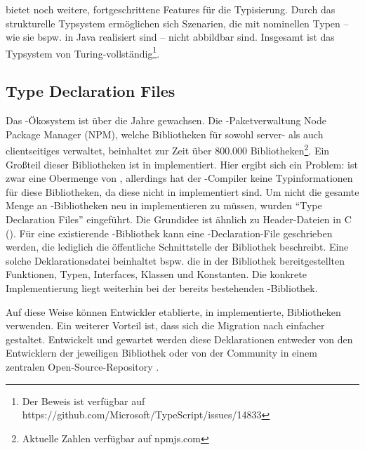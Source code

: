 \documentclass[a4paper]{scrartcl}
\begin{document}
\ts{} bietet noch weitere, fortgeschrittene Features für die Typisierung.
Durch das strukturelle Typsystem ermöglichen sich Szenarien, die mit nominellen Typen -- wie sie bspw. in Java realisiert sind -- nicht abbildbar sind.
Insgesamt ist das Typsystem von \ts{} Turing-vollständig\footnote{Der Beweis ist verfügbar auf https://github.com/Microsoft/TypeScript/issues/14833}.

\subsection{Type Declaration Files}\label{dts}
Das \js-Ökosystem ist über die Jahre gewachsen.
Die \js-Paketverwaltung Node Package Manager (NPM), welche Bibliotheken für sowohl server- als auch clientseitiges \js{} verwaltet, beinhaltet zur Zeit über 800.000 Bibliotheken\footnote{Aktuelle Zahlen verfügbar auf npmjs.com}.
Ein Großteil dieser Bibliotheken ist in \js{} implementiert.
Hier ergibt sich ein Problem:
\ts{} ist zwar eine Obermenge von \js{}, allerdings hat der \ts-Compiler keine Typinformationen für diese Bibliotheken, da diese nicht in \ts{} implementiert sind.
Um nicht die gesamte Menge an \js-Bibliotheken neu in \ts{} implementieren zu müssen, wurden \enquote{Type Declaration Files} eingeführt.
Die Grundidee ist ähnlich zu Header-Dateien in C ().
Für eine existierende \js-Bibliothek kann eine \ts-Declaration-File geschrieben werden, die lediglich die öffentliche Schnittstelle der Bibliothek beschreibt.
Eine solche Deklarationsdatei beinhaltet bspw. die in der Bibliothek bereitgestellten Funktionen, Typen, Interfaces, Klassen und Konstanten.
Die konkrete Implementierung liegt weiterhin bei der bereits bestehenden \js-Bibliothek.

Auf diese Weise können Entwickler etablierte, in \js{} implementierte, Bibliotheken verwenden.
Ein weiterer Vorteil ist, dass sich die Migration nach \ts{} einfacher gestaltet.
Entwickelt und gewartet werden diese Deklarationen entweder von den Entwicklern der jeweiligen Bibliothek oder von der Community in einem zentralen Open-Source-Repository \cite{dt}.


\end{document}
